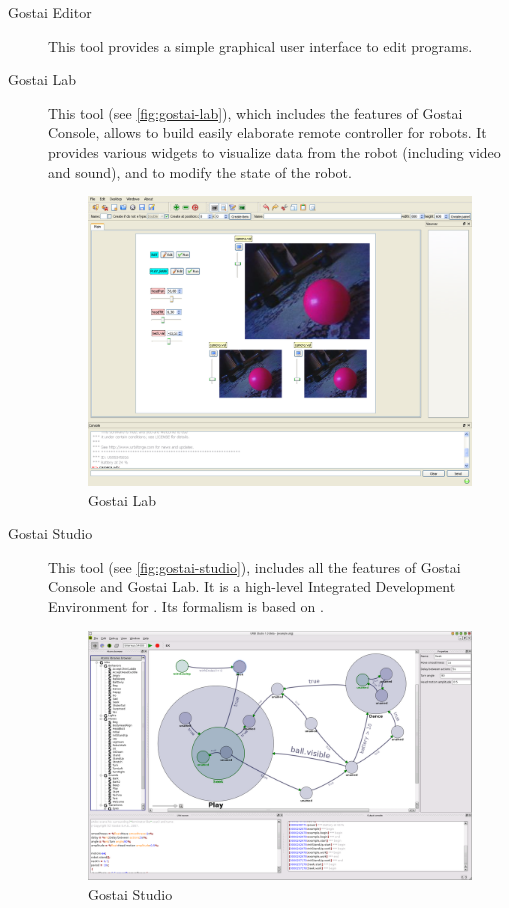 \begin{description}
\item[Gostai Editor] This tool provides a simple graphical user interface to
  edit \us programs.

\item[Gostai Lab] This tool (see \autoref{fig:gostai-lab}), which
  includes the features of Gostai Console, allows to build easily
  elaborate remote controller for robots.  It provides various widgets
  to visualize data from the robot (including video and sound), and to
  modify the state of the robot.

  \begin{figure}[htp]
    \centering
    \includegraphics[width=.8\linewidth]{img/gostai-lab}
    \caption{Gostai Lab}
    \label{fig:gostai-lab}
  \end{figure}

\item[Gostai Studio] This tool (see \autoref{fig:gostai-studio}),
  includes all the features of Gostai Console and Gostai Lab.  It is a
  high-level Integrated Development Environment for \urbi.  Its
  formalism is based on .

  \begin{figure}[htp]
    \centering
    \includegraphics[width=.8\linewidth]{img/gostai-studio}
    \caption{Gostai Studio}
    \label{fig:gostai-studio}
  \end{figure}


\end{description}
